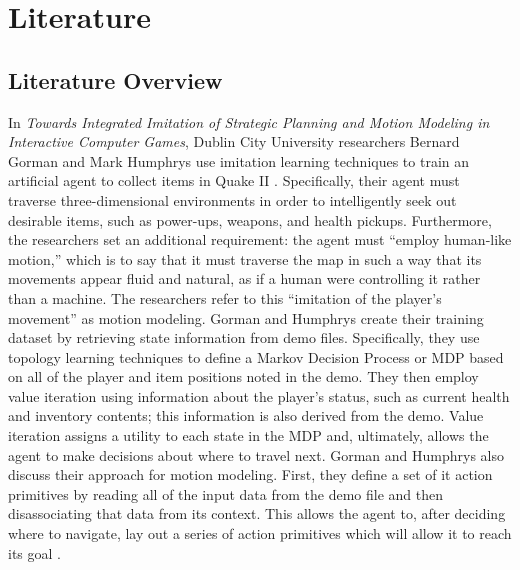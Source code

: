 \chapter{Literature}
\label{ch:Literature}



\section{Literature Overview}

In {\it Towards Integrated Imitation of Strategic Planning and Motion Modeling in Interactive Computer Games}, Dublin City University researchers Bernard Gorman and Mark Humphrys use imitation learning techniques to train an artificial agent to collect items in Quake II \cite{Gorman:2006}. Specifically, their agent must traverse three-dimensional environments in order to intelligently seek out desirable items, such as power-ups, weapons, and health pickups. Furthermore, the researchers set an additional requirement: the agent must ``employ human-like motion,'' which is to say that it must traverse the map in such a way that its movements appear fluid and natural, as if a human were controlling it rather than a machine. The researchers refer to this ``imitation of the player's movement'' as motion modeling. Gorman and Humphrys create their training dataset by retrieving state information from demo files. Specifically, they use topology learning techniques to define a Markov Decision Process or MDP based on all of the player and item positions noted in the demo. They then employ value iteration using information about the player's status, such as current health and inventory contents; this information is also derived from the demo. Value iteration assigns a utility to each state in the MDP and, ultimately, allows the agent to make decisions about where to travel next. Gorman and Humphrys also discuss their approach for motion modeling. First, they define a set of it action primitives by reading all of the input data from the demo file and then disassociating that data from its context. This allows the agent to, after deciding where to navigate, lay out a series of action primitives which will allow it to reach its goal \cite{Gorman:2006}.


